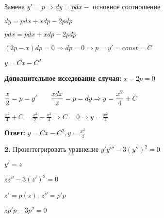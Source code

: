 \documentclass[a4paper]{article}
\begin{document}
Замена $\displaystyle y'=p \Rightarrow dy=pdx - $ основное соотношение

\vspace{0.3cm}


$\displaystyle dy=pdx+xdp-2pdp$

\vspace{0.3cm}

$\displaystyle pdx=pdx+xdp-2pdp$

\vspace{0.3cm}

$\displaystyle (2p-x)dp=0 \Rightarrow dp=0 \Rightarrow p =y'=const=C$

\vspace{0.3cm}

$\displaystyle y=Cx-C^2$

\vspace{0.3cm}

\textbf{Дополнительное исседование случая:} $\displaystyle x-2p=0$

\vspace{0.3cm}

$\displaystyle \frac{x}{2}=p=y'\hspace{0.7cm} \frac{xdx}{2}=p=dy \Rightarrow y=\frac{x^2}{4}+C$

\vspace{0.3cm}

$\displaystyle \frac{x^2}{4} + C=\frac{x^2}{2} -\frac{x^2}{4} \Rightarrow C=0 \Rightarrow y=\frac{x^2}{4}$


\textbf{Ответ: } $\displaystyle y=Cx-C^2, y=\frac{x^2}{4}$

\vspace{1cm}

\textbf{2.} Проинтегрировать уравнение $\displaystyle y'y'''-3(y'')^2=0$

\vspace{0.3cm}

$\displaystyle y'=z$

\vspace{0.3cm}

$\displaystyle zz''-3(z')^2=0$

\vspace{0.3cm}

$\displaystyle z'=p(z)$; \hspace{1cm} $ \displaystyle z''=p'p$

\vspace{0.3cm}

$\displaystyle zp'p-3p^2=0$

\vspace{0.3cm}
\end{document}
